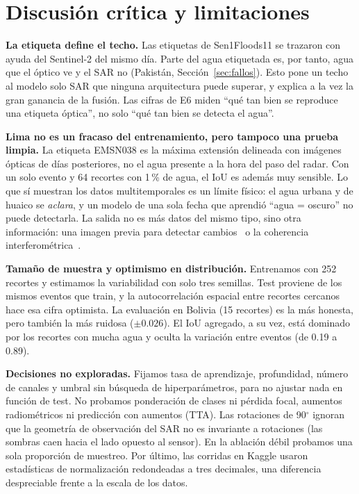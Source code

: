 \section{Discusión crítica y limitaciones}
\label{sec:discusion}

\textbf{La etiqueta define el techo.} Las etiquetas de Sen1Floods11 se trazaron con ayuda del
Sentinel-2 del mismo día. Parte del agua etiquetada es, por tanto, agua que el óptico ve y el SAR
no (Pakistán, Sección~\ref{sec:fallos}). Esto pone un techo al modelo solo SAR que ninguna
arquitectura puede superar, y explica a la vez la gran ganancia de la fusión. Las cifras de E6
miden ``qué tan bien se reproduce una etiqueta óptica'', no solo ``qué tan bien se detecta el
agua''.

\textbf{Lima no es un fracaso del entrenamiento, pero tampoco una prueba limpia.} La etiqueta
EMSN038 es la máxima extensión delineada con imágenes ópticas de días posteriores, no el agua
presente a la hora del paso del radar. Con un solo evento y 64 recortes con 1\,\% de agua, el IoU
es además muy sensible. Lo que sí muestran los datos multitemporales es un límite físico: el
agua urbana y de huaico se \emph{aclara}, y un modelo de una sola fecha que aprendió ``agua =
oscuro'' no puede detectarla. La salida no es más datos del mismo tipo, sino otra información:
una imagen previa para detectar cambios~\cite{bountos2024kurosiwo} o la coherencia
interferométrica~\cite{zhao2022urbanaware}.

\textbf{Tamaño de muestra y optimismo en distribución.} Entrenamos con 252 recortes y estimamos
la variabilidad con solo tres semillas. Test proviene de los mismos eventos que train, y la
autocorrelación espacial entre recortes cercanos hace esa cifra optimista. La evaluación en
Bolivia (15 recortes) es la más honesta, pero también la más ruidosa ($\pm0.026$). El IoU
agregado, a su vez, está dominado por los recortes con mucha agua y oculta la variación entre
eventos (de 0.19 a 0.89).

\textbf{Decisiones no exploradas.} Fijamos tasa de aprendizaje, profundidad, número de canales y
umbral sin búsqueda de hiperparámetros, para no ajustar nada en función de test. No probamos
ponderación de clases ni pérdida focal, aumentos radiométricos ni predicción con aumentos (TTA).
Las rotaciones de 90$^\circ$ ignoran que la geometría de observación del SAR no es invariante a
rotaciones (las sombras caen hacia el lado opuesto al sensor). En la ablación débil probamos una
sola proporción de muestreo. Por último, las corridas en Kaggle usaron estadísticas de
normalización redondeadas a tres decimales, una diferencia despreciable frente a la escala de
los datos.
